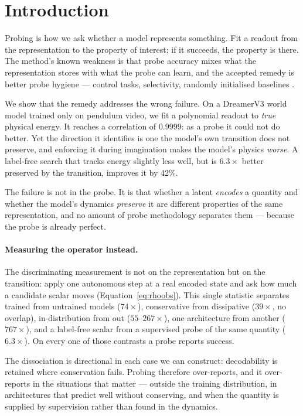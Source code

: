\section{Introduction}
\label{sec:intro}

Probing is how we ask whether a model represents something. Fit a readout from the representation to
the property of interest; if it succeeds, the property is there. The method's known weakness is that
probe accuracy mixes what the representation stores with what the probe can learn, and the accepted
remedy is better probe hygiene --- control tasks, selectivity, randomly initialised baselines
\citep{hewitt2019control,belinkov2022probing}.

We show that the remedy addresses the wrong failure. On a DreamerV3 world model trained only on
pendulum video, we fit a polynomial readout to \emph{true} physical energy. It reaches a correlation
of $0.9999$: as a probe it could not do better. Yet the direction it identifies is one the model's
own transition does not preserve, and enforcing it during imagination makes the model's physics
\emph{worse}. A label-free search that tracks energy slightly less well, but is $6.3\times$ better
preserved by the transition, improves it by 42\%.

The failure is not in the probe. It is that whether a latent \emph{encodes} a quantity and whether
the model's dynamics \emph{preserve} it are different properties of the same representation, and no
amount of probe methodology separates them --- because the probe is already perfect.

\paragraph{Measuring the operator instead.}
The discriminating measurement is not on the representation but on the transition: apply one
autonomous step at a real encoded state and ask how much a candidate scalar moves
(Equation~\ref{eq:rhoobs}). This single statistic separates trained from untrained models
($74\times$), conservative from dissipative ($39\times$, no overlap), in-distribution from out
($55$--$267\times$), one architecture from another ($767\times$), and a label-free scalar from a
supervised probe of the same quantity ($6.3\times$). On every one of those contrasts a probe reports
success.

The dissociation is directional in each case we can construct: decodability is retained where
conservation fails. Probing therefore over-reports, and it over-reports in the situations that
matter --- outside the training distribution, in architectures that predict well without conserving,
and when the quantity is supplied by supervision rather than found in the dynamics.

